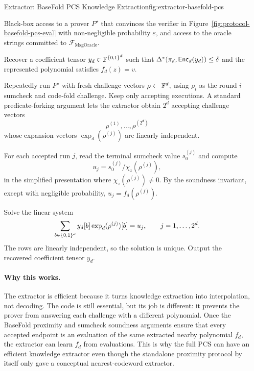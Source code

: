 \begin{protocolbox}{Extractor: BaseFold PCS Knowledge Extraction}{fig:extractor-basefold-pcs}
\footnotesize
\begin{description}[leftmargin=0.22in,style=nextline,itemsep=0.18em,topsep=0.2em,parsep=0pt]
  \item[Input.]
        Black-box access to a prover $P^\star$ that convinces the verifier in
        Figure~\ref{fig:protocol-basefold-pcs-eval} with non-negligible
        probability $\varepsilon$, and access to the oracle strings committed to
        $\mathcal F_{\mathrm{MsgOracle}}$.
  \item[Goal.]
        Recover a coefficient tensor $y_d\in\mathbb{F}^{\{0,1\}^d}$ such that
        $\Delta^*(\pi_d,\mathsf{Enc}_d(y_d))\le\delta$ and the represented polynomial
        satisfies $f_d(z)=v$.
  \item[Collect successful challenges.]
        Repeatedly run $P^\star$ with fresh challenge vectors
        $\rho\leftarrow\mathbb{F}^d$, using $\rho_i$ as the round-$i$ sumcheck and
        code-fold challenge.  Keep only accepting executions.  A standard
        predicate-forking argument lets the extractor obtain $2^d$ accepting
        challenge vectors
        \[
          \rho^{(1)},\ldots,\rho^{(2^d)}
        \]
        whose expansion vectors
        $\operatorname{exp}_d(\rho^{(j)})$ are linearly independent.
  \item[Record endpoint values.]
        For each accepted run $j$, read the terminal sumcheck value
        $s_0^{(j)}$ and compute
        \[
          u_j=s_0^{(j)}/\chi_z(\rho^{(j)}),
        \]
        in the simplified presentation where $\chi_z(\rho^{(j)})\ne0$.  By the
        soundness invariant, except with negligible probability,
        $u_j=f_d(\rho^{(j)})$.
  \item[Interpolate.]
        Solve the linear system
        \[
          \sum_{b\in\{0,1\}^d}
            y_d[b]\operatorname{exp}_d(\rho^{(j)})[b]
          =
          u_j,
          \qquad j=1,\ldots,2^d.
        \]
        The rows are linearly independent, so the solution is unique.  Output
        the recovered coefficient tensor $y_d$.
\end{description}
\end{protocolbox}

\paragraph{Why this works.}
The extractor is efficient because it turns knowledge extraction into
interpolation, not decoding.  The code is still essential, but its job is
different: it prevents the prover from answering each challenge with a different
polynomial.  Once the BaseFold proximity and sumcheck soundness arguments ensure
that every accepted endpoint is an evaluation of the same extracted nearby
polynomial $f_d$, the extractor can learn $f_d$ from evaluations.  This is why
the full PCS can have an
efficient knowledge extractor even though the standalone proximity protocol by
itself only gave a conceptual nearest-codeword extractor.


